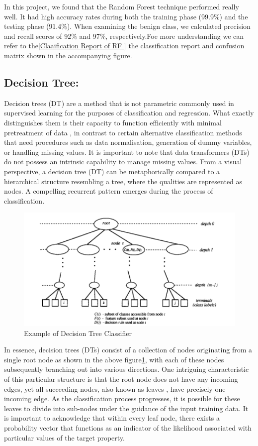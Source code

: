 In this project, we found that the Random Forest technique performed really well. It had high accuracy rates during both the training phase (99.9\%) and the testing phase (91.4\%). When examining the benign class, we calculated precision and recall scores of 92\% and 97\%, respectively.Foe more understanding we can refer to the\ref{Claaification Report of RF } the classification report and confusion matrix shown in the accompanying figure.

\subsection{Decision Tree:}


Decision trees (DT) are a method that is not parametric commonly used in supervised learning for the purposes of classification and regression. What exactly distinguishes them is their capacity to function efficiently with minimal pretreatment of data \cite{YANG201361}, in contrast to certain alternative classification methods that need procedures such as data normalisation, generation of dummy variables, or handling missing values. It is important to note that data transformers (DTs) do not possess an intrinsic capability to manage missing values. From a visual perspective, a decision tree (DT) can be metaphorically compared to a hierarchical structure resembling a tree, where the qualities are represented as nodes. A compelling recurrent pattern emerges during the process of classification.

\begin{figure}[htb]
\centering
\centerline{\includegraphics[width=1\textwidth]{DTexample.png}}
\caption{Example of Decision Tree Classifier}
\label{example DT }
\end{figure}

In essence, decision trees (DTs) consist of a collection of nodes originating from a single root node as shown in the above figure\ref{example DT }, with each of these nodes subsequently branching out into various directions. One intriguing characteristic of this particular structure is that the root node does not have any incoming edges, yet all succeeding nodes, also known as leaves \cite{YANG201361}, have precisely one incoming edge. As the classification process progresses, it is possible for these leaves to divide into sub-nodes under the guidance of the input training data. It is important to acknowledge that within every leaf node, there exists a probability vector that functions as an indicator of the likelihood associated with particular values of the target property.

